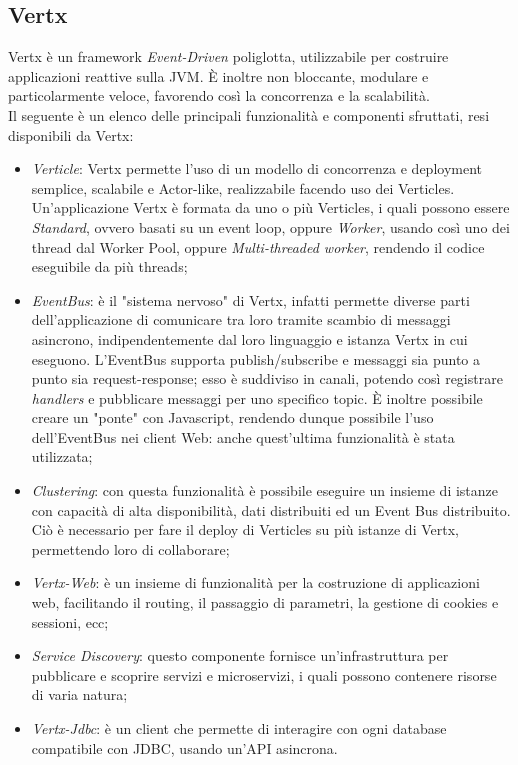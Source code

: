 \subsection{Vertx}
Vertx è un framework \textit{Event-Driven} poliglotta, utilizzabile per costruire applicazioni reattive sulla JVM. È inoltre non
bloccante, modulare e particolarmente veloce, favorendo così la concorrenza e la scalabilità. 
\\Il seguente è un elenco delle principali funzionalità e componenti sfruttati, resi disponibili da Vertx:
\begin{itemize}
    \item \textit{Verticle}: Vertx permette l'uso di un modello di concorrenza e deployment semplice, scalabile e Actor-like,
    realizzabile facendo uso dei Verticles. Un'applicazione Vertx è formata da uno o più Verticles, i quali possono essere \textit{Standard}, ovvero basati su un event loop, oppure \textit{Worker}, usando così uno dei thread dal Worker Pool, oppure \textit{Multi-threaded worker}, rendendo il codice eseguibile da più threads;
    \item \textit{EventBus}: è il "sistema nervoso" di Vertx, infatti permette diverse parti dell'applicazione di comunicare tra loro tramite scambio di messaggi asincrono, indipendentemente dal loro linguaggio e istanza Vertx in cui eseguono. L'EventBus supporta publish/subscribe e messaggi sia punto a punto sia request-response; esso è suddiviso in canali, potendo così registrare \textit{handlers} e pubblicare messaggi per uno specifico topic. È inoltre possibile creare un "ponte" con Javascript, rendendo dunque possibile l'uso dell'EventBus nei client Web: anche quest'ultima funzionalità è stata utilizzata;
    \item \textit{Clustering}: con questa funzionalità è possibile eseguire un insieme di istanze con capacità di alta disponibilità, dati distribuiti ed un Event Bus distribuito. Ciò è necessario per fare il deploy di Verticles su più istanze di Vertx, permettendo loro di collaborare;
    \item \textit{Vertx-Web}: è un insieme di funzionalità per la costruzione di applicazioni web, facilitando il routing, 
    il passaggio di parametri, la gestione di cookies e sessioni, ecc;
    \item \textit{Service Discovery}: questo componente fornisce un'infrastruttura per pubblicare e scoprire servizi e microservizi, i quali possono contenere risorse di varia natura;
    \item \textit{Vertx-Jdbc}: è un client che permette di interagire con ogni database compatibile con JDBC, usando
    un'API asincrona.
\end{itemize}
